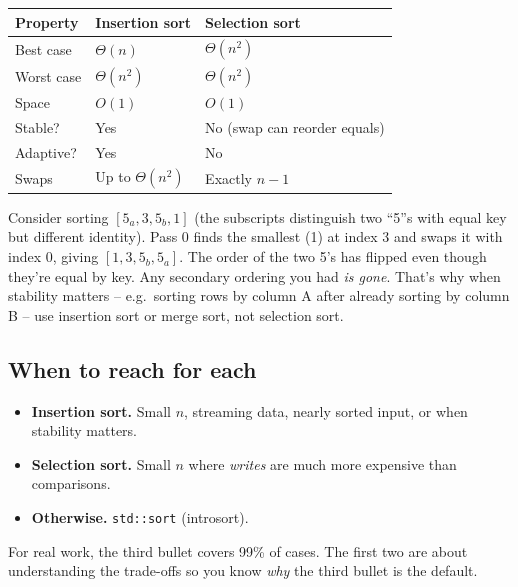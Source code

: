 \documentclass[11pt]{article}
\begin{document}
\begin{center}
\footnotesize
\renewcommand{\arraystretch}{1.3}
\begin{tabular}{@{}lll@{}}
\hline
\textbf{Property}     & \textbf{Insertion sort} & \textbf{Selection sort} \\
\hline
Best case             & $\Theta(n)$             & $\Theta(n^2)$ \\
Worst case            & $\Theta(n^2)$           & $\Theta(n^2)$ \\
Space                 & $O(1)$                  & $O(1)$ \\
Stable?               & Yes                     & No (swap can reorder equals) \\
Adaptive?             & Yes                     & No \\
Swaps                 & Up to $\Theta(n^2)$     & Exactly $n - 1$ \\
\hline
\end{tabular}
\end{center}

\begin{warnbox}
Consider sorting $[5_a, 3, 5_b, 1]$ (the subscripts distinguish two
``5''s with equal key but different identity). Pass 0 finds the
smallest (1) at index 3 and swaps it with index 0, giving
$[1, 3, 5_b, 5_a]$. The order of the two 5's has flipped even though
they're equal by key. Any secondary ordering you had \emph{is gone}.
That's why when stability matters -- e.g.\ sorting rows by column A
after already sorting by column B -- use insertion sort or merge
sort, not selection sort.
\end{warnbox}

\subsection{When to reach for each}

\begin{ideabox}
\begin{itemize}[leftmargin=*]
  \item \textbf{Insertion sort.} Small $n$, streaming data, nearly
        sorted input, or when stability matters.
  \item \textbf{Selection sort.} Small $n$ where \emph{writes} are
        much more expensive than comparisons.
  \item \textbf{Otherwise.} \texttt{std::sort} (introsort).
\end{itemize}
For real work, the third bullet covers 99\% of cases. The first two
are about understanding the trade-offs so you know \emph{why} the
third bullet is the default.
\end{ideabox}
\end{document}
